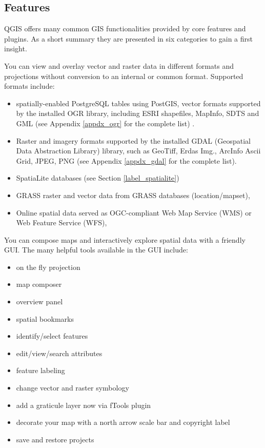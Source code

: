\subsection{Features}\label{label_majfeat}

QGIS offers many common GIS functionalities provided by core features and
plugins. As a short summary they are presented in six categories to gain a
first insight.


You can view and overlay vector and raster data in different formats and
projections without conversion to an internal or common format. Supported
formats include:

\begin{itemize}
\item spatially-enabled PostgreSQL tables using PostGIS, vector 
formats
 supported by the installed OGR library, including ESRI shapefiles, MapInfo, 
SDTS and GML (see Appendix \ref{appdx_ogr} for the complete list) .
\item Raster and imagery formats supported by the installed GDAL (Geospatial
Data Abstraction Library) library, such as GeoTiff, Erdas Img., ArcInfo Ascii 
Grid, JPEG, PNG (see Appendix \ref{appdx_gdal} for the complete list).
\item SpatiaLite databases (see Section \ref{label_spatialite}) 
\item GRASS raster and vector data from GRASS databases (location/mapset), 
\item Online spatial data served as OGC-compliant Web Map Service (WMS) or
Web Feature Service (WFS),
\end{itemize}


You can compose maps and interactively explore spatial data with a friendly
GUI. The many helpful tools available in the GUI include:

\begin{itemize}
\item on the fly projection
\item map composer
\item overview panel
\item spatial bookmarks
\item identify/select features
\item edit/view/search attributes
\item feature labeling
\item change vector and raster symbology
\item add a graticule layer now via fTools plugin
\item decorate your map with a north arrow scale bar and copyright label
\item save and restore projects
\end{itemize}

